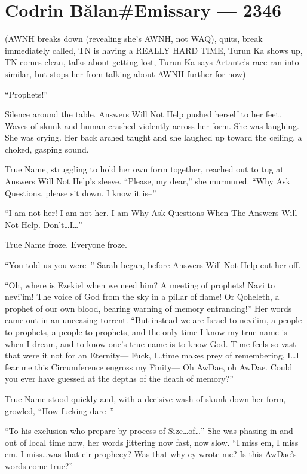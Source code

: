 \hypertarget{codrin-bux103lanemissary-2346}{%
\chapter{Codrin Bălan\#Emissary — 2346}\label{codrin-bux103lanemissary-2346}}

(AWNH breaks down (revealing she's AWNH, not WAQ), quits, break immediately called, TN is having a REALLY HARD TIME, Turun Ka shows up, TN comes clean, talks about getting lost, Turun Ka says Artante's race ran into similar, but stops her from talking about AWNH further for now)

``Prophets!''

Silence around the table. Answers Will Not Help pushed herself to her feet. Waves of skunk and human crashed violently across her form. She was laughing. She was crying. Her back arched taught and she laughed up toward the ceiling, a choked, gasping sound.

True Name, struggling to hold her own form together, reached out to tug at Answers Will Not Help's sleeve. ``Please, my dear,'' she murmured. ``Why Ask Questions, please sit down. I know it is--''

``I am not her! I am not her. I am Why Ask Questions When The Answers Will Not Help. Don't\ldots I\ldots{}''

True Name froze. Everyone froze.

``You told us you were--'' Sarah began, before Answers Will Not Help cut her off.

``Oh, where is Ezekiel when we need him? A meeting of prophets! Navi to nevi'im! The voice of God from the sky in a pillar of flame! Or Qoheleth, a prophet of our own blood, bearing warning of memory entrancing!'' Her words came out in an unceasing torrent. ``But instead we are Israel to nevi'im, a people to prophets, a people to prophets, and the only time I know my true name is when I dream, and to know one's true name is to know God. Time feels so vast that were it not for an Eternity— Fuck, I\ldots time makes prey of remembering, I\ldots I fear me this Circumference engross my Finity— Oh AwDae, oh AwDae. Could you ever have guessed at the depths of the death of memory?''

True Name stood quickly and, with a decisive wash of skunk down her form, growled, ``How fucking dare--''

``To his exclusion who prepare by process of Size\ldots of\ldots{}'' She was phasing in and out of local time now, her words jittering now fast, now slow. ``I miss em, I miss em. I miss\ldots was that eir prophecy? Was that why ey wrote me? Is this AwDae's words come true?''

